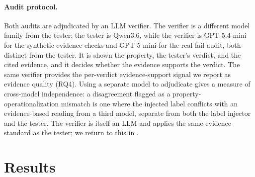 \documentclass[11pt]{article}
\newcommand{\qwen}{Qwen3.6}
\begin{document}
\paragraph{Audit protocol.}
Both audits are adjudicated by an LLM verifier.
The verifier is a different model family from the tester: the tester is
\qwen{}, while the verifier is GPT-5.4-mini for the synthetic evidence checks
and GPT-5-mini for the real fail audit, both distinct from the tester.
It is shown the property, the tester's verdict, and the cited evidence, and it
decides whether the evidence supports the verdict.
The same verifier provides the per-verdict evidence-support signal we report as
evidence quality (RQ4).
Using a separate model to adjudicate gives a measure of cross-model
independence: a disagreement flagged as a property-operationalization mismatch
is one where the injected label conflicts with an evidence-based reading from a
third model, separate from both the label injector and the tester.
The verifier is itself an LLM and applies the same evidence standard as the
tester; we return to this in .

\section{Results}
\label{sec:results}
\end{document}
